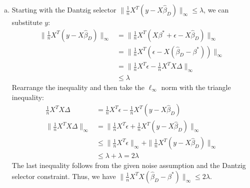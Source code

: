 \documentclass[11pt,a4paper,margin=1in]{article}
\begin{document}
\begin{enumerate}[(a)]
    We can bound the $\ell_1$ norm since $S$ and $S^c$ partition the coordinates,
    where $\|\Delta\|_1 = \|\Delta_S\|_1 + \|\Delta_{S^c}\|_1 \leq \|\Delta_S\|_1 + \|\Delta_S\|_1 = 2\|\Delta_S\|_1$.
    Then, we can bound $\|\Delta_S\|_1$ using the Cauchy-Schwarz inequality and the
    fact that $|S| = \kappa$:
    \begin{align*}
        \|\Delta_S\|_1 &= \sum_{i \in S}|\Delta_i| \\
        &\leq \sqrt{\sum_{i \in S}1^2}\sqrt{\sum_{i \in S}|\Delta_i|^2} \\
        &= \sqrt{\kappa}\|\Delta_S\|_2
    \end{align*}
    $\|\Delta_S\|_2 \leq \|\Delta\|_2$, because the squared Euclidean norm over
    the subset of coordinates cannot exceed the squared Euclidean norm over all coordinates. 
    Thus, combining the inequalities, we have:
    \begin{align*}
        \|\Delta\|_1 &\leq 2\|\Delta_S\|_1 \\
        &\leq 2\sqrt{\kappa}\|\Delta_S\|_2 \\
        &\leq 2\sqrt{\kappa}\|\Delta\|_2
    \end{align*}
    Therefore, $\|\hat{\beta}_D - \beta^*\|_1 \leq 2\sqrt{\kappa}\|\hat{\beta}_D - \beta^*\|_2$.
    \item Starting with the Dantzig selector $\|\frac{1}{n}X^T(y - X\hat{\beta}_D)\|_\infty \leq \lambda$, 
    we can substitute $y$:
    \begin{align*}
        \|\frac{1}{n}X^T(y - X\hat{\beta}_D)\|_\infty &= \|\frac{1}{n}X^T(X\beta^* + \epsilon - X\hat{\beta}_D)\|_\infty \\
        &= \|\frac{1}{n}X^T(\epsilon - X(\hat{\beta}_D - \beta^*))\|_\infty \\
        &= \|\frac{1}{n}X^T\epsilon - \frac{1}{n}X^TX\Delta\|_\infty \\
        &\leq \lambda
    \end{align*}
    Rearrange the inequality and then take the $\ell_\infty$ norm with the triangle inequality:
    \begin{align*}
        \frac{1}{n}X^TX\Delta &= \frac{1}{n}X^T\epsilon - \frac{1}{n}X^T(y - X\hat{\beta}_D) \\
        \|\frac{1}{n}X^TX\Delta\|_\infty &= \|\frac{1}{n}X^T\epsilon + \frac{1}{n}X^T(y - X\hat{\beta}_D)\|_\infty \\
        &\leq \|\frac{1}{n}X^T\epsilon\|_\infty + \|\frac{1}{n}X^T(y - X\hat{\beta}_D)\|_\infty \\
        &\leq \lambda + \lambda = 2\lambda
    \end{align*}
    The last inequality follows from the given noise assumption and the Dantzig 
    selector constraint. Thus, we have $\|\frac{1}{n}X^TX(\hat{\beta}_D - \beta^*)\|_\infty \leq 2\lambda$.


\end{enumerate}
\end{document}
